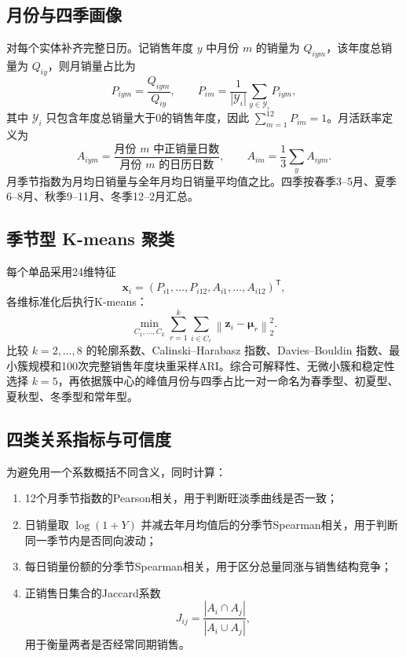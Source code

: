 \documentclass[UTF8,12pt]{ctexart}
\begin{document}
\subsection{月份与四季画像}

对每个实体补齐完整日历。记销售年度 $y$ 中月份 $m$ 的销量为 $Q_{iym}$，该年度总销量为 $Q_{iy}$，则月销量占比为
\begin{equation}
P_{iym}=\frac{Q_{iym}}{Q_{iy}},\qquad
P_{im}=\frac{1}{|\mathcal Y_i|}\sum_{y\in\mathcal Y_i}P_{iym},
\end{equation}
其中 $\mathcal Y_i$ 只包含年度总销量大于0的销售年度，因此 $\sum_{m=1}^{12}P_{im}=1$。月活跃率定义为
\begin{equation}
A_{iym}=\frac{\text{月份 }m\text{ 中正销量日数}}{\text{月份 }m\text{ 的日历日数}},\qquad
A_{im}=\frac{1}{3}\sum_y A_{iym}.
\end{equation}
月季节指数为月均日销量与全年月均日销量平均值之比。四季按春季3--5月、夏季6--8月、秋季9--11月、冬季12--2月汇总。

\subsection{季节型 K-means 聚类}

每个单品采用24维特征
\begin{equation}
\mathbf x_i=(P_{i1},\ldots,P_{i12},A_{i1},\ldots,A_{i12})^{\mathsf T},
\end{equation}
各维标准化后执行K-means：
\begin{equation}
\min_{C_1,\ldots,C_k}\sum_{r=1}^{k}\sum_{i\in C_r}
\left\|\mathbf z_i-\boldsymbol\mu_r\right\|_2^2.
\end{equation}
比较 $k=2,\ldots,8$ 的轮廓系数、Calinski--Harabasz 指数、Davies--Bouldin 指数、最小簇规模和100次完整销售年度块重采样ARI。综合可解释性、无微小簇和稳定性选择 $k=5$，再依据簇中心的峰值月份与四季占比一对一命名为春季型、初夏型、夏秋型、冬季型和常年型。

\subsection{四类关系指标与可信度}

为避免用一个系数概括不同含义，同时计算：
\begin{enumerate}
  \item 12个月季节指数的Pearson相关，用于判断旺淡季曲线是否一致；
  \item 日销量取 $\log(1+Y)$ 并减去年月均值后的分季节Spearman相关，用于判断同一季节内是否同向波动；
  \item 每日销量份额的分季节Spearman相关，用于区分总量同涨与销售结构竞争；
  \item 正销售日集合的Jaccard系数
  \begin{equation}
  J_{ij}=\frac{|A_i\cap A_j|}{|A_i\cup A_j|},
  \end{equation}
  用于衡量两者是否经常同期销售。
\end{enumerate}
\end{document}
